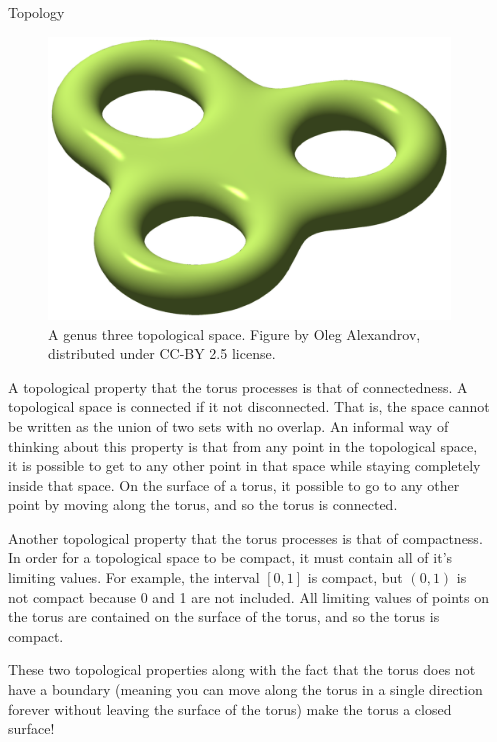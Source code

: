 \documentclass{beamer}
\newlength{\sepwidth}
\newlength{\colwidth}
\newcommand{\separatorcolumn}{\begin{column}{\sepwidth}\end{column}}
\begin{document}
\begin{frame}[t]
\begin{columns}[t]
\begin{column}{\colwidth}
\begin{block}{Topology}
\begin{figure}[htbp]
    \hfill
    \begin{minipage}[b]{0.32\textwidth}
        \centering
        \includegraphics[width=\textwidth]{figures/triple_torus.png}
        \caption{A genus three topological space. Figure by Oleg Alexandrov, distributed under CC-BY 2.5 license.}
        \label{fig:triple torus}
    \end{minipage}

\end{figure}

A topological property that the torus processes is that of connectedness. A topological space is connected if it not disconnected. That is, the space cannot be written as the union of two sets with no overlap. An informal way of thinking about this property is that from any point in the topological space, it is possible to get to any other point in that space while staying completely inside that space. On the surface of a torus, it possible to go to any other point by moving along the torus, and so the torus is connected.

Another topological property that the torus processes is that of compactness. In order for a topological space to be compact, it must contain all of it's limiting values. For example, the interval \([0,1]\) is compact, but \((0,1)\) is not compact because 0 and 1 are not included. All limiting values of points on the torus are contained on the surface of the torus, and so the torus is compact. 

These two topological properties along with the fact that the torus does not have a boundary (meaning you can move along the torus in a single direction forever without leaving the surface of the torus) make the torus a closed surface!
\end{block}
\end{column}
\separatorcolumn%


\end{columns}
\end{frame}
\end{document}
